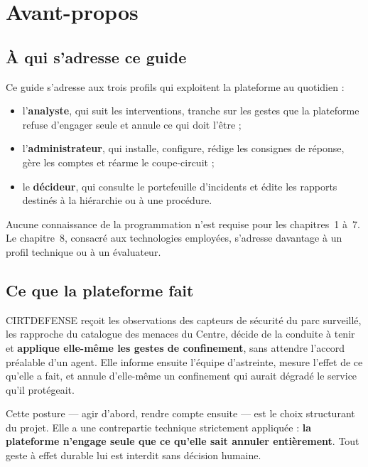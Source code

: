 \chapter*{Avant-propos}

\section*{\`A qui s'adresse ce guide}

Ce guide s'adresse aux trois profils qui exploitent la plateforme au
quotidien :

\begin{itemize}[leftmargin=*]
  \item l'\textbf{analyste}, qui suit les interventions, tranche sur les gestes
        que la plateforme refuse d'engager seule et annule ce qui doit l'\^etre ;
  \item l'\textbf{administrateur}, qui installe, configure, r\'edige les
        consignes de r\'eponse, g\`ere les comptes et r\'earme le coupe-circuit ;
  \item le \textbf{d\'ecideur}, qui consulte le portefeuille d'incidents et
        \'edite les rapports destin\'es \`a la hi\'erarchie ou \`a une
        proc\'edure.
\end{itemize}

Aucune connaissance de la programmation n'est requise pour les chapitres~1
\`a~7. Le chapitre~8, consacr\'e aux technologies employ\'ees, s'adresse
davantage \`a un profil technique ou \`a un \'evaluateur.

\section*{Ce que la plateforme fait}

CIRTDEFENSE re\c{c}oit les observations des capteurs de s\'ecurit\'e du parc
sur\-veill\'e, les rapproche du catalogue des menaces du Centre, d\'ecide de la
conduite \`a tenir et \textbf{applique elle-m\^eme les gestes de confinement},
sans attendre l'accord pr\'ealable d'un agent. Elle informe ensuite l'\'equipe
d'astreinte, mesure l'effet de ce qu'elle a fait, et annule d'elle-m\^eme un
confinement qui aurait d\'egrad\'e le service qu'il prot\'egeait.

Cette posture --- agir d'abord, rendre compte ensuite --- est le choix
structurant du projet. Elle a une contrepartie technique strictement
appliqu\'ee : \textbf{la plateforme n'engage seule que ce qu'elle sait
annuler enti\`erement}. Tout geste \`a effet durable lui est interdit sans
d\'ecision humaine.

